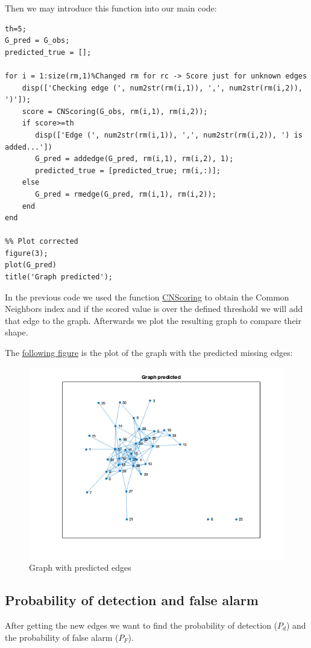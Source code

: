 \documentclass[12pt]{article}
\begin{document}
Then we may introduce this function into our main code:

\begin{lstlisting}
th=5;
G_pred = G_obs;
predicted_true = [];

for i = 1:size(rm,1)%Changed rm for rc -> Score just for unknown edges
    disp(['Checking edge (', num2str(rm(i,1)), ',', num2str(rm(i,2)), ')']);
    score = CNScoring(G_obs, rm(i,1), rm(i,2));
    if score>=th
       disp(['Edge (', num2str(rm(i,1)), ',', num2str(rm(i,2)), ') is added...'])
       G_pred = addedge(G_pred, rm(i,1), rm(i,2), 1);
       predicted_true = [predicted_true; rm(i,:)];
    else
       G_pred = rmedge(G_pred, rm(i,1), rm(i,2));
    end    
end

%% Plot corrected
figure(3);
plot(G_pred)
title('Graph predicted');

\end{lstlisting}
\justifying
In the previous code we used the function \href{code:CNScoring}{CNScoring} to obtain the Common Neighbors index and if the scored value is over the defined threshold we will add that edge to the graph. Afterwards we plot the resulting graph to compare their shape.

The \href{fig:correctedGraph}{following figure} is the plot of the graph with the predicted missing edges: 
\begin{figure}[H]
    \centering
    \includegraphics[width=13cm]{images/3.png}
    \caption{Graph with predicted edges}
    \label{fig:correctedGraph}
\end{figure}
\subsection{Probability of detection and false alarm}
\justifying
After getting the new edges we want to find the probability of detection ($P_d$) and the probability of false alarm ($P_F$). 
\end{document}
